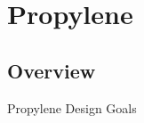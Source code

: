 %
%
\section{Propylene}
\subsection{Overview}
\begin{frame}{Propylene Design Goals}  


\end{frame}




% 


